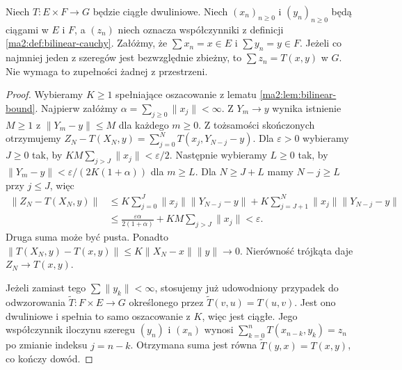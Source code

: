 \begin{twierdzenie}
\label{ma2:thm:bilinear-mertens}
Niech $T:E\times F\to G$ będzie ciągłe dwuliniowe.
Niech $(x_n)_{n\ge0}$ i $(y_n)_{n\ge0}$ będą ciągami
w $E$ i $F$, a $(z_n)$ niech oznacza współczynniki
z definicji \ref{ma2:def:bilinear-cauchy}.
Załóżmy, że $\sum x_n=x\in E$ i $\sum y_n=y\in F$.
Jeżeli co najmniej jeden z szeregów jest bezwzględnie
zbieżny, to $\sum z_n=T(x,y)$ w $G$.
Nie wymaga to zupełności żadnej z przestrzeni.
\end{twierdzenie}
\begin{proof}
Wybieramy $K\ge1$ spełniające oszacowanie z lematu
\ref{ma2:lem:bilinear-bound}. Najpierw załóżmy
$\alpha=\sum_{j\ge0}\|x_j\|<\infty$.
Z $Y_m\to y$ wynika istnienie $M\ge1$ z
$\|Y_m-y\|\le M$ dla każdego $m\ge0$.
Z tożsamości skończonych otrzymujemy
$Z_N-T(X_N,y)=\sum_{j=0}^N T(x_j,Y_{N-j}-y)$.
Dla $\varepsilon>0$ wybieramy $J\ge0$ tak, by
$KM\sum_{j>J}\|x_j\|<\varepsilon/2$.
Następnie wybieramy $L\ge0$ tak, by
$\|Y_m-y\|<\varepsilon/(2K(1+\alpha))$ dla $m\ge L$.
Dla $N\ge J+L$ mamy $N-j\ge L$ przy $j\le J$, więc
\[
\begin{aligned}
 \|Z_N-T(X_N,y)\|
 &\le K\sum_{j=0}^J\|x_j\|\|Y_{N-j}-y\|
    +K\sum_{j=J+1}^N\|x_j\|\|Y_{N-j}-y\|\\
 &\le \frac{\varepsilon\alpha}{2(1+\alpha)}
      +KM\sum_{j>J}\|x_j\|<\varepsilon.
\end{aligned}
\]
Druga suma może być pusta. Ponadto
$\|T(X_N,y)-T(x,y)\|\le K\|X_N-x\|\|y\|\to0$.
Nierówność trójkąta daje $Z_N\to T(x,y)$.

Jeżeli zamiast tego $\sum\|y_k\|<\infty$, stosujemy
już udowodniony przypadek do odwzorowania
$\widetilde T:F\times E\to G$ określonego przez
$\widetilde T(v,u)=T(u,v)$. Jest ono dwuliniowe
i spełnia to samo oszacowanie z $K$, więc jest ciągłe.
Jego współczynnik iloczynu szeregu $(y_n)$ i $(x_n)$
wynosi $\sum_{k=0}^n T(x_{n-k},y_k)=z_n$ po zmianie
indeksu $j=n-k$. Otrzymana suma jest równa
$\widetilde T(y,x)=T(x,y)$, co kończy dowód.
\end{proof}

